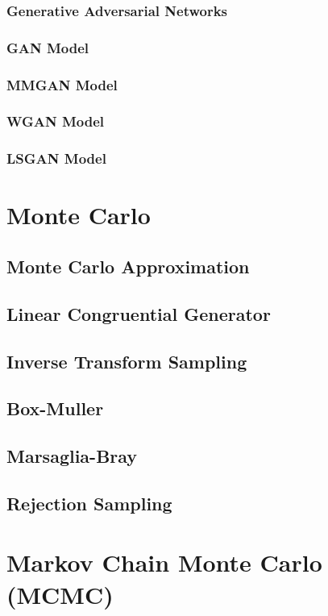 \documentclass{article}
\begin{document}
\subsubsection{Generative Adversarial Networks}
\subsubsection{GAN Model}
\subsubsection{MMGAN Model}
\subsubsection{WGAN Model}
\subsubsection{LSGAN Model}


\section{Monte Carlo}
\subsection{Monte Carlo Approximation}
\subsection{Linear Congruential Generator}
\subsection{Inverse Transform Sampling}
\subsection{Box-Muller}
\subsection{Marsaglia-Bray}
\subsection{Rejection Sampling}

\section{Markov Chain Monte Carlo (MCMC)}
\end{document}
